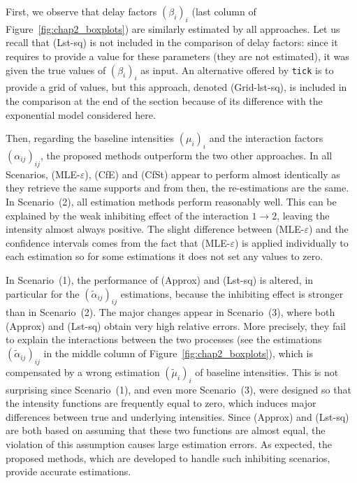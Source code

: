     First, we observe that delay factors \((\beta_i)_i\)
    (last column of Figure~\ref{fig:chap2_boxplots})
    are similarly estimated by all approaches.
    Let us recall that (Lst-sq) is not included in the comparison of delay factors:
    since it requires to provide a value for these parameters (they are not estimated),
    it was given the true values of \((\beta_i)_i\) as input.
    An alternative offered by \texttt{tick} is to provide a grid
    of values, but this approach, denoted (Grid-lst-sq), is included in the comparison at the end of the section because of its difference with the exponential model considered here.
    
    Then, regarding the baseline intensities \((\mu_i)_i\) and the interaction factors \((\alpha_{ij})_{ij}\),
    the proposed methods outperform the two other approaches.
    In all Scenarios, (MLE-$\varepsilon$), (CfE) and (CfSt) appear to perform almost identically as they retrieve the same supports and from then, the re-estimations are the same.
    In Scenario~(2), all estimation methods perform reasonably well. 
    This can be explained by the weak inhibiting effect of the interaction $1\to2$, leaving the intensity almost always positive.
    The slight difference between (MLE-$\varepsilon$) and the confidence intervals comes from the fact that (MLE-$\varepsilon$) is applied individually to each estimation so for some estimations it does not set any values to zero.
    
    
    In Scenario~(1), the performance of (Approx) and (Lst-sq) is altered, in particular for the \((\tilde \alpha_{ij})_{ij}\) estimations, because the inhibiting effect is stronger than in Scenario~(2).
    The major changes appear in Scenario~(3), where both (Approx) and (Lst-sq) obtain very high relative errors.
    More precisely, they fail to explain the interactions between the two processes (see the estimations \((\tilde \alpha_{ij})_{ij}\) in the middle column of Figure~\ref{fig:chap2_boxplots}), which is compensated by a wrong estimation \((\tilde \mu_i)_i\) of baseline intensities.
    This is not surprising since Scenario~(1), and even more Scenario~(3), were designed so that the intensity functions are frequently equal to zero, which induces major differences between true and underlying intensities.
    Since (Approx) and (Lst-sq) are both based on assuming that these two functions are almost equal, the violation of this assumption causes large estimation errors.
    As expected, the proposed methods, which are developed to handle such inhibiting scenarios, provide accurate estimations.
    
